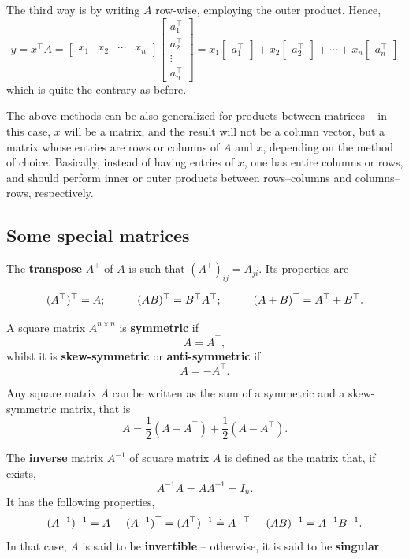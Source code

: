 \documentclass[10pt]{report}
\begin{document}
The third way is by writing \(A\) row\--wise, employing the outer product. Hence, $$y = x^\top A = \begin{bmatrix} x_1 & x_2 & \cdots & x_n\end{bmatrix}\begin{bmatrix}a_1^\top \\ a_2^\top \\ \vdots \\ a_n^\top\end{bmatrix} = x_1\begin{bmatrix}a_1^\top\end{bmatrix} + x_2\begin{bmatrix}a_2^\top\end{bmatrix} + \cdots + x_n\begin{bmatrix}a_n^\top\end{bmatrix}$$ which is quite the contrary as before.

The above methods can be also generalized for products between matrices -- in this case, \(x\) will be a matrix, and the result will not be a column vector, but a matrix whose entries are rows or columns of \(A\) and \(x\), depending on the method of choice. Basically, instead of having entries of \(x\), one has entire columns or rows, and should perform inner or outer products between rows\---columns and columns\---rows, respectively.
\subsection{Some special matrices}
\label{sec:org22817cc}
The \textbf{transpose} \(A^\top\) of \(A\) is such that \(\left(A^\top\right)_{ij} = A_{ji}\). Its properties are

$$(A^\top)^\top = A; \hspace*{1cm} (AB)^\top = B^\top A^\top; \hspace*{1cm} (A + B)^\top = A^\top + B^\top.$$

A square matrix \(A^{n \times n}\) is \textbf{symmetric} if $$A = A^\top,$$ whilst it is \textbf{skew\--symmetric} or \textbf{anti\--symmetric} if $$A = -A^\top.$$

Any square matrix \(A\) can be written as the sum of a symmetric and a skew\--symmetric matrix, that is $$A = \frac 1 2 (A + A^\top) + \frac 1 2 (A - A^\top).$$

The \textbf{inverse} matrix \(A^{-1}\) of square matrix \(A\) is defined as the matrix that, if exists, $$A^{-1}A = AA^{-1} = I_n.$$ It has the following properties,
$$(A^{-1})^{-1} = A \hspace*{0.5cm} (A^{-1})^\top = (A^\top)^{-1} \doteq A^{-\top} \hspace*{0.5cm} (AB)^{-1} = A^{-1}B^{-1}.$$ In that case, \(A\) is said to be \textbf{invertible} -- otherwise, it is said to be \textbf{singular}.
\end{document}
